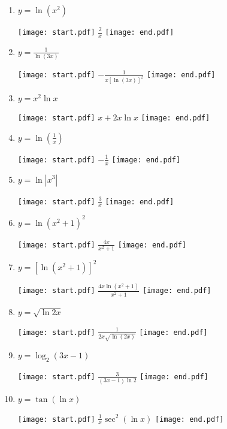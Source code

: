 \documentclass[12pt]{article}
\begin{document}
\begin{enumerate}

\item $y = \ln{(x^2)}$ 

\texttt{[image: start.pdf]}
{{$\frac{2}{x}$}}
\texttt{[image: end.pdf]}


\item $y = \frac{1}{\ln{(3x)}}$ 

\texttt{[image: start.pdf]}
{{$-\frac{1}{x[\ln{(3x)}]^2}$}}
\texttt{[image: end.pdf]}


\item $y = x^2\ln{x}$ 

\texttt{[image: start.pdf]}
{{$x+2x\ln{x}$}}
\texttt{[image: end.pdf]}


\item $y = \ln{\left(\frac{1}{x}\right)}$ 

\texttt{[image: start.pdf]}
{{$-\frac{1}{x}$}}
\texttt{[image: end.pdf]}


\item $y = \ln|x^3|$ 

\texttt{[image: start.pdf]}
{{$\frac{3}{x}$}}
\texttt{[image: end.pdf]}


\item $y = \ln{(x^2+1)^2}$ 

\texttt{[image: start.pdf]}
{{$\frac{4x}{x^2+1}$}}
\texttt{[image: end.pdf]}


\item $y = \left[\ln{(x^2+1)}\right]^2$ 

\texttt{[image: start.pdf]}
{{$\frac{4x\ln{(x^2+1)}}{x^2+1}$}}
\texttt{[image: end.pdf]}


\item $y = \sqrt{\ln{2x}}$ 

\texttt{[image: start.pdf]}
{{$\frac{1}{2x\sqrt{\ln{(2x)}}}$}}
\texttt{[image: end.pdf]}


\item $y = \log_{2}{(3x-1)}$ 

\texttt{[image: start.pdf]}
{{$\frac{3}{(3x-1)\ln2}$}}
\texttt{[image: end.pdf]}


\item $y = \tan{(\ln{x})}$ 

\texttt{[image: start.pdf]}
{{$\frac{1}{x}\sec^{2}(\ln{x})$}}
\texttt{[image: end.pdf]}



\end{enumerate}
\end{document}
